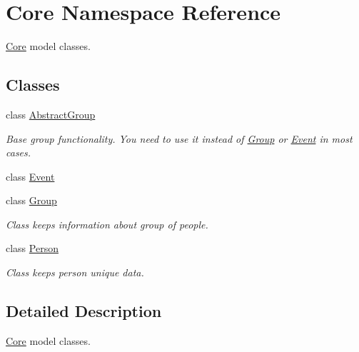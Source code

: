 \hypertarget{namespaceCore}{
\section{Core Namespace Reference}
\label{d3/d7a/namespaceCore}
}


\hyperlink{namespaceCore}{Core} model classes.  


\subsection*{Classes}
\begin{DoxyCompactItemize}
\item 
class \hyperlink{classCore_1_1AbstractGroup}{AbstractGroup}
\begin{DoxyCompactList}\small\item\em Base group functionality. You need to use it instead of \hyperlink{classCore_1_1Group}{Group} or \hyperlink{classCore_1_1Event}{Event} in most cases. \item\end{DoxyCompactList}\item 
class \hyperlink{classCore_1_1Event}{Event}
\item 
class \hyperlink{classCore_1_1Group}{Group}
\begin{DoxyCompactList}\small\item\em Class keeps information about group of people. \item\end{DoxyCompactList}\item 
class \hyperlink{classCore_1_1Person}{Person}
\begin{DoxyCompactList}\small\item\em Class keeps person unique data. \item\end{DoxyCompactList}\end{DoxyCompactItemize}


\subsection{Detailed Description}
\hyperlink{namespaceCore}{Core} model classes. 